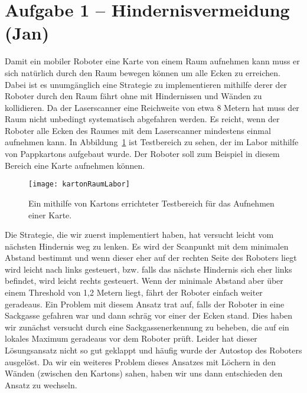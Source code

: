 \section{Aufgabe 1 -- Hindernisvermeidung (Jan)}

Damit ein mobiler Roboter eine Karte von einem Raum aufnehmen kann muss er sich natürlich durch den Raum bewegen können um alle Ecken zu erreichen. Dabei ist es unumgänglich eine Strategie zu implementieren mithilfe derer der Roboter durch den Raum fährt ohne mit Hindernissen und Wänden zu kollidieren.
Da der Laserscanner eine Reichweite von etwa 8 Metern hat muss der Raum nicht unbedingt systematisch abgefahren werden. Es reicht, wenn der Roboter alle Ecken des Raumes mit dem Laserscanner mindestens einmal aufnehmen kann. In Abbildung~\ref{fig:kartonRaumLabor} ist Testbereich zu sehen, der im Labor mithilfe von Pappkartons aufgebaut wurde. Der Roboter soll zum Beispiel in diesem Bereich eine Karte aufnehmen können.

\begin{figure}[H]
	\centering
	\texttt{[image: kartonRaumLabor]}
	\caption{Ein mithilfe von Kartons errichteter Testbereich für das Aufnehmen einer Karte.}
	\label{fig:kartonRaumLabor}
\end{figure}

Die Strategie, die wir zuerst implementiert haben, hat versucht leicht vom nächsten Hindernis weg zu lenken. Es wird der Scanpunkt mit dem minimalen Abstand bestimmt und wenn dieser eher auf der rechten Seite des Roboters liegt wird leicht nach links gesteuert, bzw. falls das nächste Hindernis sich eher links befindet, wird leicht rechts gesteuert. Wenn der minimale Abstand aber über einem Threshold von 1,2 Metern liegt, fährt der Roboter einfach weiter geradeaus.
Ein Problem mit diesem Ansatz trat auf, falls der Roboter in eine Sackgasse gefahren war und dann schräg vor einer der Ecken stand.
Dies haben wir zunächst versucht durch eine Sackgassenerkennung zu beheben, die auf ein lokales Maximum geradeaus vor dem Roboter prüft.
Leider hat dieser Lösungsansatz nicht so gut geklappt und häufig wurde der Autostop des Roboters ausgelöst. Da wir ein weiteres Problem dieses Ansatzes mit Löchern in den Wänden (zwischen den Kartons) sahen, haben wir uns dann entschieden den Ansatz zu wechseln.

